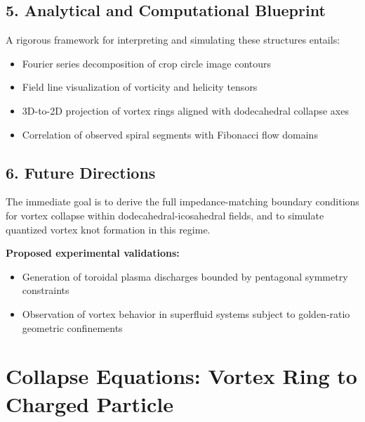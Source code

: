 \documentclass[11pt]{article}
\begin{document}
\subsection*{5. Analytical and Computational Blueprint}

A rigorous framework for interpreting and simulating these structures entails:

\begin{itemize}

\item Fourier series decomposition of crop circle image contours

\item Field line visualization of vorticity and helicity tensors

\item 3D-to-2D projection of vortex rings aligned with dodecahedral collapse axes

\item Correlation of observed spiral segments with Fibonacci flow domains

\end{itemize}


\subsection*{6. Future Directions}

The immediate goal is to derive the full impedance-matching boundary conditions for vortex collapse within dodecahedral-icosahedral fields, and to simulate quantized vortex knot formation in this regime.


\textbf{Proposed experimental validations:}

\begin{itemize}

\item Generation of toroidal plasma discharges bounded by pentagonal symmetry constraints

\item Observation of vortex behavior in superfluid systems subject to golden-ratio geometric confinements

\end{itemize}



\section*{Collapse Equations: Vortex Ring to Charged Particle}
\end{document}
